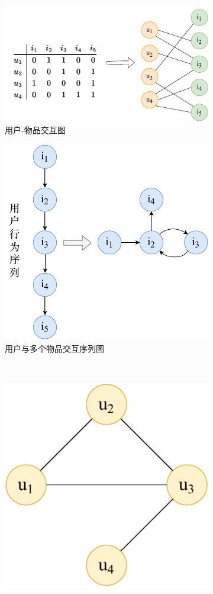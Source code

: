 \begin{figure}
    \centering
    \begin{subfigure}{0.45\linewidth}
        \centering
        \includegraphics[width=.88\linewidth]{figure/ui-graph.drawio.pdf}
        \caption{用户-物品交互图}
        \label{tag:ui-date}
    \end{subfigure}
    \begin{subfigure}{0.45\linewidth}
        \centering
        \includegraphics[width=.7\linewidth]{figure/user-seq.drawio.pdf}
        \caption{用户与多个物品交互序列图}
        \label{tag:squ-data}
    \end{subfigure} \\
    \begin{subfigure}{0.45\linewidth}
        \centering
        \includegraphics[width=.5\linewidth]{figure/social_graph.drawio.pdf}

\end{subfigure}
\end{figure}
